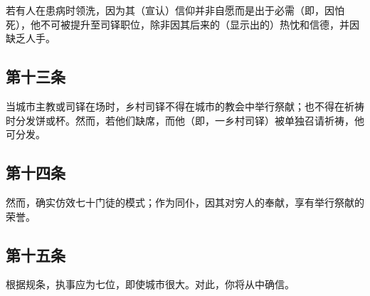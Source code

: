 若有人在患病时领洗，因为其（宣认）信仰并非自愿而是出于必需（即，因怕死），他不可被提升至司铎职位，除非因其后来的（显示出的）热忱和信德，并因缺乏人手。\par

\par

\par


\subsection{第十三条}

当城市主教或司铎在场时，乡村司铎不得在城市的教会中举行祭献；也不得在祈祷时分发饼或杯。然而，若他们缺席，而他（即，一乡村司铎）被单独召请祈祷，他可分发。\par

\par


\subsection{第十四条}

然而，确实仿效七十门徒的模式；作为同仆，因其对穷人的奉献，享有举行祭献的荣誉。\par

\par


\subsection{第十五条}

根据规条，执事应为七位，即使城市很大。对此，你将从中确信。\par

